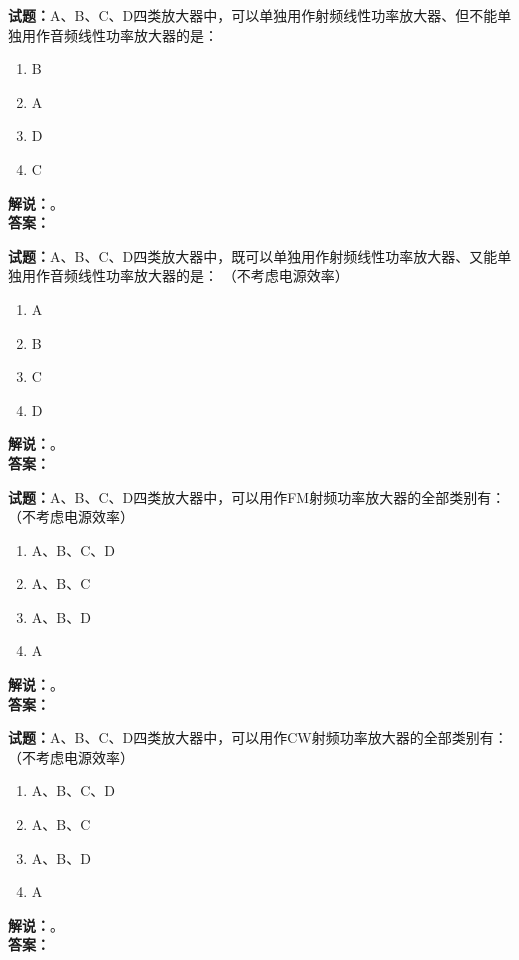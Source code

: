 \documentclass{ctexbook}
\begin{document}
\bigskip

\noindent\textbf{试题：}A、B、C、D四类放大器中，可以单独用作射频线性功率放大器、但不能单独用作音频线性功率放大器的是：
\begin{enumerate}[leftmargin=3em]
  \item B
  \item A
  \item D
  \item C
\end{enumerate}
\noindent\textbf{解说：}\textbf{}。\\\noindent\textbf{答案：}

\bigskip

\noindent\textbf{试题：}A、B、C、D四类放大器中，既可以单独用作射频线性功率放大器、又能单独用作音频线性功率放大器的是： （不考虑电源效率）
\begin{enumerate}[leftmargin=3em]
  \item A
  \item B
  \item C
  \item D
\end{enumerate}
\noindent\textbf{解说：}\textbf{}。\\\noindent\textbf{答案：}

\bigskip

\noindent\textbf{试题：}A、B、C、D四类放大器中，可以用作FM射频功率放大器的全部类别有： （不考虑电源效率）
\begin{enumerate}[leftmargin=3em]
  \item A、B、C、D
  \item A、B、C
  \item A、B、D
  \item A
\end{enumerate}
\noindent\textbf{解说：}\textbf{}。\\\noindent\textbf{答案：}

\bigskip

\noindent\textbf{试题：}A、B、C、D四类放大器中，可以用作CW射频功率放大器的全部类别有： （不考虑电源效率）
\begin{enumerate}[leftmargin=3em]
  \item A、B、C、D
  \item A、B、C
  \item A、B、D
  \item A
\end{enumerate}
\noindent\textbf{解说：}\textbf{}。\\\noindent\textbf{答案：}
\end{document}
